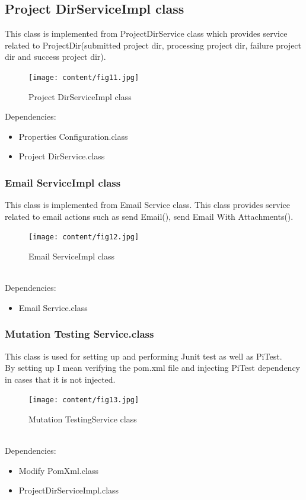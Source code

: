 \subsection{Project DirServiceImpl class}
This class is implemented from ProjectDirService class which provides service related to ProjectDir(submitted project dir, processing project dir, failure project dir and success project dir).
\begin{figure}[h!]
	\centering
	\texttt{[image: content/fig11.jpg]}
	\caption{Project DirServiceImpl class}
	\label{fig:f11}
\end{figure}
\newpage
Dependencies:
\begin{itemize}
\item Properties Configuration.class
\item Project DirService.class
\end{itemize}
\subsubsection{Email ServiceImpl class}
This class is implemented from Email Service class. This class provides service related to email actions such as send Email(), send Email With Attachments().\\
\begin{figure}[h!]
	\centering
	\texttt{[image: content/fig12.jpg]}
	\caption{Email ServiceImpl class}
	\label{fig:f11}
\end{figure}\\
\newpage
Dependencies:
\begin{itemize}
\item Email Service.class
\end{itemize}
\subsubsection{Mutation Testing Service.class}
This class is used for setting up and performing Junit test as well as PiTest.\\
By setting up I mean verifying the pom.xml file and injecting PiTest dependency in cases that it is not injected.
\begin{figure}[h!]
	\centering
	\texttt{[image: content/fig13.jpg]}
	\caption{Mutation TestingService class}
	\label{fig:f11}
\end{figure}\\
Dependencies:
\begin{itemize}
\item Modify PomXml.class
\item ProjectDirServiceImpl.class
\end{itemize}
